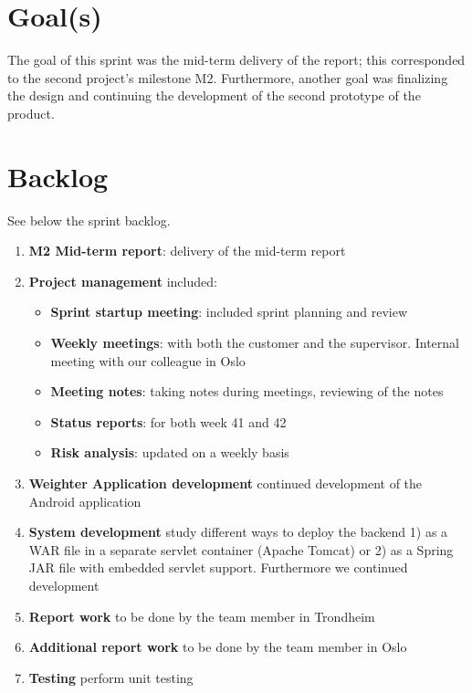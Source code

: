 \section{Goal(s)}

The goal of this sprint was the mid-term delivery of the report; this corresponded to
the second project's milestone M2. Furthermore, another goal was finalizing the design and continuing
the development of the second prototype of the product.%

\section{Backlog}
See below the sprint backlog.

\begin{enumerate}[1.]
\item \textbf{M2 Mid-term report}:
	delivery of the mid-term report
\item \textbf{Project management} included:
	\begin{itemize}
		\item \textbf{Sprint startup meeting}:
			included sprint planning and review
		\item \textbf{Weekly meetings}: 
			with both the customer and the supervisor. Internal meeting with our colleague in Oslo
		\item \textbf{Meeting notes}:
			taking notes during meetings, reviewing of the notes
		\item \textbf{Status reports}:
			for both week 41 and 42
		\item \textbf{Risk analysis}:
			updated on a weekly basis
	\end{itemize}
	\item \textbf{Weighter Application development}\newline
		continued development of the Android application
	\item \textbf{System development}\newline
		study different ways to deploy the backend
		1) as a WAR file in a separate servlet container (Apache Tomcat) or 2) as a Spring JAR file
		with embedded servlet support. Furthermore we continued development
	\item \textbf{Report work}\newline
		to be done by the team member in Trondheim
	\item \textbf{Additional report work}\newline
		to be done by the team member in Oslo
	\item \textbf{Testing}\newline
		perform unit testing
\end{enumerate}

